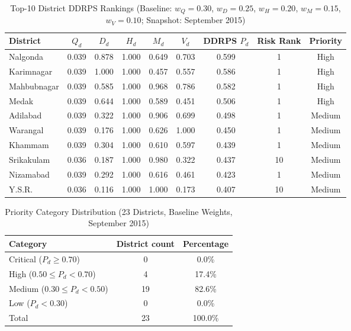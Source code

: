 \documentclass[conference]{IEEEtran}
\begin{document}
\begin{table}[t]
\caption{Top-10 District DDRPS Rankings (Baseline: $w_Q=0.30$, $w_D=0.25$, $w_H=0.20$, $w_M=0.15$, $w_V=0.10$; Snapshot: September 2015)}
\label{tab:ddrpsresults}
\centering
\footnotesize
\begin{tabular}{@{}lcccccccc@{}}
\toprule
District & $Q_d$ & $D_d$ & $H_d$ & $M_d$ & $V_d$ & DDRPS $P_d$ & Risk Rank & Priority \\
\midrule
Nalgonda    & 0.039 & 0.878 & 1.000 & 0.649 & 0.703 & 0.599 & 1  & High \\
Karimnagar  & 0.039 & 1.000 & 1.000 & 0.457 & 0.557 & 0.586 & 1  & High \\
Mahbubnagar & 0.039 & 0.585 & 1.000 & 0.968 & 0.786 & 0.582 & 1  & High \\
Medak       & 0.039 & 0.644 & 1.000 & 0.589 & 0.451 & 0.506 & 1  & High \\
Adilabad    & 0.039 & 0.322 & 1.000 & 0.906 & 0.699 & 0.498 & 1  & Medium \\
Warangal    & 0.039 & 0.176 & 1.000 & 0.626 & 1.000 & 0.450 & 1  & Medium \\
Khammam     & 0.039 & 0.304 & 1.000 & 0.610 & 0.597 & 0.439 & 1  & Medium \\
Srikakulam  & 0.036 & 0.187 & 1.000 & 0.980 & 0.322 & 0.437 & 10 & Medium \\
Nizamabad   & 0.039 & 0.292 & 1.000 & 0.616 & 0.461 & 0.423 & 1  & Medium \\
Y.S.R.      & 0.036 & 0.116 & 1.000 & 1.000 & 0.173 & 0.407 & 10 & Medium \\
\bottomrule
\end{tabular}
\end{table}

\begin{table}[t]
\caption{Priority Category Distribution (23 Districts, Baseline Weights, September 2015)}
\label{tab:distribution}
\centering
\footnotesize
\begin{tabular}{@{}lcc@{}}
\toprule
Category & District count & Percentage \\
\midrule
Critical ($P_d \geq 0.70$) & 0  & 0.0\% \\
High ($0.50 \leq P_d < 0.70$) & 4  & 17.4\% \\
Medium ($0.30 \leq P_d < 0.50$) & 19 & 82.6\% \\
Low ($P_d < 0.30$)             & 0  & 0.0\% \\
\midrule
Total & 23 & 100.0\% \\
\bottomrule
\end{tabular}
\end{table}
\end{document}
